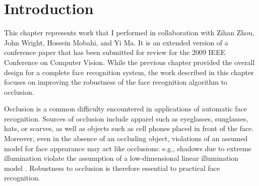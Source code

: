 

\section{Introduction}
This chapter represents work that I performed in collaboration with Zihan Zhou, John Wright, Hossein Mobahi, and Yi Ma.  It is an extended version of a conference paper that has been submitted for review for the 2009 IEEE Conference on Computer Vision.  While the previous chapter provided the overall design for a complete face recognition system, the work described in this chapter focuses on improving the robustness of the face recognition algorithm to occlusion.

Occlusion is a common difficulty encountered in applications of automatic face recognition. Sources of occlusion include apparel such as  eyeglasses, sunglasses, hats, or scarves, as well as objects such as cell phones placed in front of the face. Moreover, even in the absence of an occluding object, violations of an assumed model for face appearance may act like occlusions: e.g., shadows due to extreme illumination violate the assumption of a low-dimensional linear illumination model \cite{Basri2003-PAMI}. Robustness to occlusion is therefore essential to practical face recognition.

